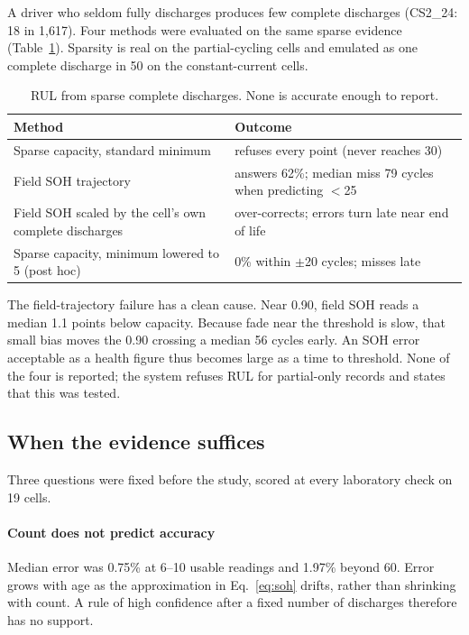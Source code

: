 \documentclass[preprint,12pt,authoryear]{elsarticle}
\begin{document}
A driver who seldom fully discharges produces few complete discharges (CS2\_24:
18 in 1{,}617). Four methods were evaluated on the same sparse evidence
(Table~\ref{tab:sparse}). Sparsity is real on the partial-cycling cells and
emulated as one complete discharge in 50 on the constant-current cells.

\begin{table}[t]
\centering
\caption{RUL from sparse complete discharges. None is accurate enough to report.}
\label{tab:sparse}
\begin{tabular}{p{}p{}}
\toprule
Method & Outcome \\
\midrule
Sparse capacity, standard minimum & refuses every point (never reaches 30) \\
Field SOH trajectory & answers 62\%; median miss 79 cycles when predicting $<$25 \\
Field SOH scaled by the cell's own complete discharges & over-corrects; errors turn late near end of life \\
Sparse capacity, minimum lowered to 5 (post hoc) & 0\% within $\pm$20 cycles; misses late \\
\bottomrule
\end{tabular}
\end{table}

The field-trajectory failure has a clean cause. Near 0.90, field SOH reads a
median 1.1 points below capacity. Because fade near the threshold is slow, that
small bias moves the 0.90 crossing a median 56 cycles early. An SOH error
acceptable as a health figure thus becomes large as a time to threshold. None of
the four is reported; the system refuses RUL for partial-only records and
states that this was tested.

\subsection{When the evidence suffices}
\label{sec:res-suff}

Three questions were fixed before the study, scored at every laboratory check
on 19 cells.

\paragraph{Count does not predict accuracy}
Median error was 0.75\% at 6--10 usable readings and 1.97\% beyond 60. Error
grows with age as the approximation in Eq.~\eqref{eq:soh} drifts, rather than
shrinking with count. A rule of high confidence after a fixed number of
discharges therefore has no support.
\end{document}
